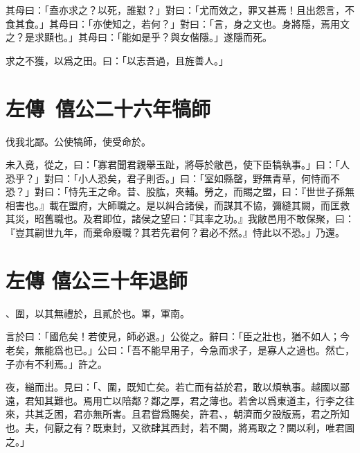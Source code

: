 其母曰：「盍亦求之？以死，誰懟？」對曰：「尤而效之，罪又甚焉！且出怨言，不食其食。」其母曰：「亦使知之，若何？」對曰：「言，身之文也。身將隱，焉用文之？是求顯也。」其母曰：「能如是乎？與女偕隱。」遂隱而死。

求之不獲，以爲之田。曰：「以志吾過，且旌善人。」

\section[展喜犒師\quad{\small 左傳\ 僖公二十六年}]{{\normalsize 左傳\ 僖公二十六年}\quad {}犒師}
伐我北鄙。公使犒師，使受命於。

未入竟，從之，曰：「寡君聞君親舉玉趾，將辱於敝邑，使下臣犒執事。」曰：「人恐乎？」對曰：「小人恐矣，君子則否。」曰：「室如縣罄，野無青草，何恃而不恐？」對曰：「恃先王之命。昔、股肱，夾輔。勞之，而賜之盟，曰：『世世子孫無相害也。』載在盟府，大師職之。是以糾合諸侯，而謀其不協，彌縫其闕，而匡救其災，昭舊職也。及君即位，諸侯之望曰：『其率之功。』我敝邑用不敢保聚，曰：『豈其嗣世九年，而棄命廢職？其若先君何？君必不然。』恃此以不恐。」乃還。

\theendnotes

\section[燭之武退秦師\quad{\small 左傳 僖公三十年}]{{\normalsize 左傳 僖公三十年}\quad {}退師}
、圍，以其無禮於，且貳於也。軍，軍南。

言於曰：「國危矣！若使見，師必退。」公從之。辭曰：「臣之壯也，猶不如人；今老矣，無能爲也已。」公曰：「吾不能早用子，今急而求子，是寡人之過也。然亡，子亦有不利焉。」許之。

夜，縋而出。見曰：「、圍，既知亡矣。若亡而有益於君，敢以煩執事。越國以鄙遠，君知其難也。焉用亡以陪鄰？鄰之厚，君之薄也。若舍以爲東道主，行李之往來，共其乏困，君亦無所害。且君嘗爲賜矣，許君、，朝濟而夕設版焉，君之所知也。夫，何厭之有？既東封，又欲肆其西封，若不闕，將焉取之？闕以利，唯君圖之。」

